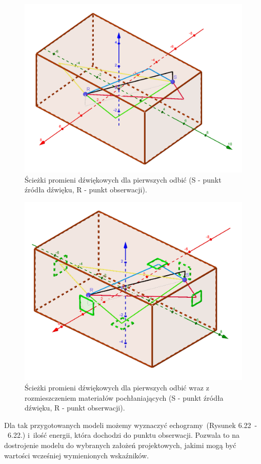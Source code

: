 \begin{figure}[H]
        \centering
                \centering
                \includegraphics[width=12cm]{1szeodbicia}
	\caption{Ścieżki promieni dźwiękowych dla pierwszych odbić (S - punkt źródła dźwięku, R - punkt obserwacji).}
\end{figure}

\begin{figure}[H]
        \centering
                \centering
                \includegraphics[width=12cm]{1odbiciazpoch}
	\caption{Ścieżki promieni dźwiękowych dla pierwszych odbić wraz z rozmieszczeniem materiałów pochłaniających (S - punkt źródła dźwięku, R - punkt obserwacji).}
\end{figure}

Dla tak przygotowanych modeli możemy wyznaczyć echogramy~(Rysunek 6.22~-~6.22.) i~ilość energii, która dochodzi do punktu obserwacji. Pozwala to na dostrojenie modelu do wybranych założeń projektowych, jakimi mogą być wartości wcześniej wymienionych wskaźników.

